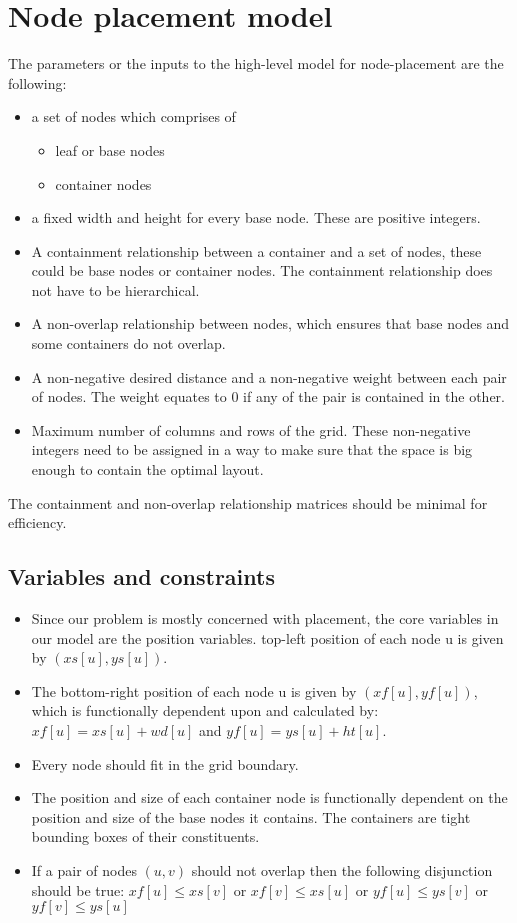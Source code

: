 \documentclass[a4paper,11pt,phdthesis,singlespace,twoside]{cssethesis}
\begin{document}
\section{Node placement model} \label{themodel}
The parameters or the inputs to the high-level model for node-placement are the following:
\begin{itemize}
\item a set of nodes which comprises of 
\begin{itemize}
\item leaf or base nodes
\item container nodes
\end{itemize}
\item a fixed width and height for every base node. These are positive integers.
\item A containment relationship between a container and a set of nodes, these could be base nodes or container nodes. The containment relationship does not have to be hierarchical.
\item A non-overlap relationship between nodes, which ensures that base nodes and some containers do not overlap.
\item A non-negative desired distance and a non-negative weight between each pair of nodes. The weight equates to 0 if any of the pair is contained in the other.
\item Maximum number of columns and rows of the grid. These non-negative integers need to be assigned in a way to make sure that the space is big enough to contain the optimal layout.
\end{itemize}
		The containment and non-overlap relationship matrices should be minimal for efficiency.

		\subsection{Variables and constraints}
\begin{itemize}
\item Since our problem is mostly concerned with placement, the core variables in our model are the position variables. top-left position of each node u is given by $(xs[u], ys[u])$.
\item The bottom-right position of each node u is given by $(xf[u],yf[u])$, which is functionally dependent upon and  calculated by: $xf[u]=xs[u]+wd[u]$ and $yf[u]=ys[u]+ht[u]$. 
\item Every node should fit in the grid boundary. 
\item The position and size of each container node is functionally dependent on the position and size of the base nodes it contains. The containers are tight bounding boxes of their constituents.
\item If a pair of nodes $(u,v)$ should not overlap then the following disjunction should be true:
		$xf[u] \leq xs[v]$ or $xf[v] \leq xs[u]$ or $yf[u] \leq ys[v]$ or $yf[v] \leq ys[u]$
\end{itemize}
\end{document}
